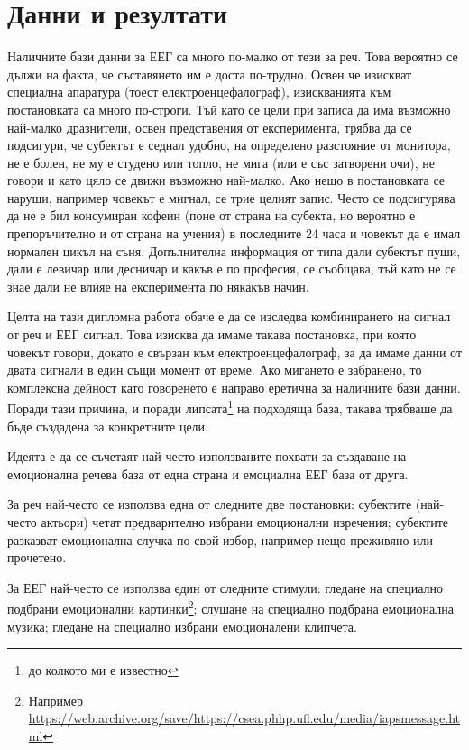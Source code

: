 \documentclass[main.tex]{subfiles}
\begin{document}
\section{Данни и резултати}

Наличните бази данни за ЕЕГ са много по-малко от тези за реч. Това вероятно се дължи на факта, че съставянето им е доста по-трудно. Освен че изискват специална апаратура (тоест електроенцефалограф), изискванията към постановката са много по-строги. Тъй като се цели при записа да има възможно най-малко дразнители, освен представения от експеримента, трябва да се подсигури, че субектът е седнал удобно, на определено разстояние от монитора, не е болен, не му е студено или топло, не мига (или е със затворени очи), не говори и като цяло се движи възможно най-малко. Ако нещо в постановката се наруши, например човекът е мигнал, се трие целият запис. Често се подсигурява да не е бил консумиран кофеин (поне от страна на субекта, но вероятно е препоръчително и от страна на учения) в последните 24 часа и човекът да е имал нормален цикъл на съня. Допълнителна информация от типа дали субектът пуши, дали е левичар или десничар и какъв е по професия, се съобщава, тъй като не се знае дали не влияе на експеримента по някакъв начин. 

Целта на тази дипломна работа обаче е да се изследва комбинирането на сигнал от реч и ЕЕГ сигнал. Това изисква да имаме такава постановка, при която човекът говори, докато е свързан към електроенцефалограф, за да имаме данни от двата сигнали в един същи момент от време. Ако мигането е забранено, то комплексна дейност като говоренето е направо еретична за наличните бази данни. Поради тази причина, и поради липсата\footnote{до колкото ми е известно} на подходяща база, такава трябваше да бъде създадена за конкретните цели.

Идеята е да се съчетаят най-често използваните похвати за създаване на емоционална речева база от една страна и емоциална ЕЕГ база от друга.

За реч най-често се използва една от следните две постановки: субектите (най-често актьори) четат предварително избрани емоционални изречения; субектите разказват емоционална случка по свой избор, например нещо преживяно или прочетено.

За ЕЕГ най-често се използва един от следните стимули: гледане на специално подбрани емоционални картинки\footnote{Например \url{https://web.archive.org/save/https://csea.phhp.ufl.edu/media/iapsmessage.html}}; слушане на специално подбрана емоционална музика; гледане на специално избрани емоционалени клипчета.
\end{document}
